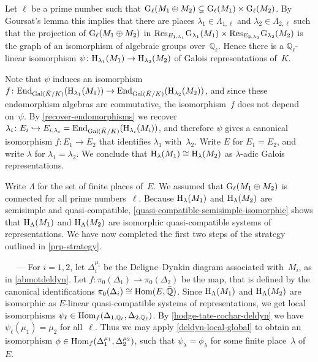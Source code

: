 \documentclass[10pt,twoside,leqno]{article}
\renewcommand{\paragraph}[1]{\par\bigskip\refstepcounter{subsection}%
 {\normalfont\normalsize\scshape\noindent\thesubsection%
 \ifthenelse{\equal{#1}{}}%
 {}%
 {\ \textls{#1.}}%
 \ ---}%
}
\numberwithin{equation}{subsection}
\newcommand{\into}{\hookrightarrow}
\newcommand{\Hom}{\textnormal{Hom}}
\newcommand{\End}{\textnormal{End}}
\newcommand{\QQ}{\mathbb{Q}}
\newcommand{\QQbar}{\bar{\QQ}}
\newcommand{\QQl}{\QQ_{\ell}}
\newcommand{\Gal}{\textnormal{Gal}}
\newcommand{\HH}{\textnormal{H}}
\newcommand{\Hlambda}{\HH_{\lambda}}
\newcommand{\HLambda}{\HH_{\Lambda}}
\newcommand{\GG}{\textnormal{G}}
\newcommand{\Gl}{\GG_{\ell}}
\newcommand{\Res}{\textnormal{Res}}
\begin{document}
Let $\ell$ be a prime number
such that $\Gl(M_1 \oplus M_2) \subsetneq \Gl(M_1) \times \Gl(M_2)$.
By Goursat's lemma this implies that there are
places $\lambda_1 \in \Lambda_{1,\ell}$
and $\lambda_2 \in \Lambda_{2,\ell}$
such that the projection of $\Gl(M_1 \oplus M_2)$ in
$\Res_{E_{1,\lambda_1}} \GG_{\lambda_1}(M_1) \times
\Res_{E_{2,\lambda_2}} \GG_{\lambda_2}(M_2)$
is the graph of an isomorphism of algebraic groups over~$\QQl$.
Hence there is a $\QQl$-linear isomorphism
$\psi \colon \HH_{\lambda_1}(M_1) \to \HH_{\lambda_2}(M_2)$
of Galois representations of~$K$.

Note that $\psi$ induces an isomorphism
$f \colon \End_{\Gal(\bar{K}/K)}(\HH_{\lambda_1}(M_1)) \to
\End_{\Gal(\bar{K}/K)}(\HH_{\lambda_2}(M_2))$,
and since these endomorphism algebras are commutative,
the isomorphism~$f$ does not depend on~$\psi$.
By \cref{recover-endomorphisms} we recover
$\lambda_i \colon E_i \into E_{i,\lambda_i} =
\End_{\Gal(\bar{K}/K)}(\HH_{\lambda_i}(M_i))$,
and therefore $\psi$ gives a canonical isomorphism
$f \colon E_1 \to E_2$ that identifies $\lambda_1$ with~$\lambda_2$.
Write $E$ for $E_1 = E_2$,
and write $\lambda$ for $\lambda_1 = \lambda_2$.
We conclude that $\Hlambda(M_1) \cong \Hlambda(M_2)$
as $\lambda$-adic Galois representations.

Write $\Lambda$ for the set of finite places of~$E$.
We assumed that $\Gl(M_{1} \oplus M_{2})$
is connected for all prime numbers~$\ell$.
Because $\Hlambda(M_1)$ and $\Hlambda(M_2)$
are semisimple and quasi-compatible,
\cref{quasi-compatible-semisimple-isomorphic}
shows that $\HLambda(M_1)$ and $\HLambda(M_2)$
are isomorphic quasi-compatible systems of representations.
We have now completed the first two steps of the strategy
outlined in \cref{prp-strategy}.

\paragraph{} %
For $i = 1,2$, let $\Delta_i^{\mu_i}$
be the Deligne--Dynkin diagram associated with~$M_i$,
as in \cref{abmotdeldyn}.
Let $f \colon \pi_0(\Delta_1) \to \pi_0(\Delta_2)$ be the map,
that is defined by the canonical identifications
$\pi_0(\Delta_i) \cong \Hom(E,\QQbar)$.
Since $\HLambda(M_1)$ and $\HLambda(M_2)$ are isomorphic
as $E$-linear quasi-compatible systems of representations,
we get local isomorphisms
$\psi_\ell \in \Hom_f(\Delta_{1,\QQl},\Delta_{2,\QQl})$.
By \cref{hodge-tate-cochar-deldyn} we have
$\psi_\ell(\mu_1) = \mu_2$ for all~$\ell$.
Thus we may apply \cref{deldyn-local-global}
to obtain an isomorphism $\phi \in \Hom_f(\Delta_1^{\mu_1},\Delta_2^{\mu_2})$,
such that $\psi_\lambda = \phi_\lambda$ for some finite place~$\lambda$ of~$E$.
\end{document}
